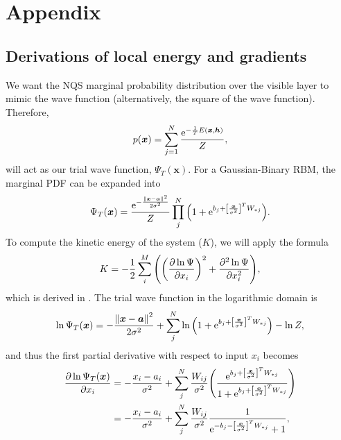 \section{Appendix}\label{sec:Appendix A}

\subsection{Derivations of local energy and gradients}

We want the NQS marginal probability distribution over the visible layer to mimic the wave function (alternatively, the square of the wave function). Therefore, 
\begin{equation*}
    p(\bm{x}) = \sum_{j=1}^N \frac{\mathrm{e}^{-\frac{1}{T}E\qty(\bm{x}, \bm{h})}}{Z}, 
\end{equation*}
will act as our trial wave function, $\Psi_T(\bm{x})$. For a Gaussian-Binary RBM, the marginal PDF can be expanded into
\begin{equation*}
    \Psi_T(\bm{x}) = \frac{\mathrm{e}^{-\frac{\norm{\bm{x}-\bm{a}}^2}{2\sigma^2}}}{Z}\prod_j^N \qty(1 + \mathrm{e}^{b_j + \qty[\frac{\bm{x}}{\sigma^2}]^T W_{*j}}). 
\end{equation*}
To compute the kinetic energy of the system ($K$), we will apply the formula 
\begin{equation*}
    K = -\frac{1}{2}\sum_i^M \qty(\qty(\pdv{\ln{\Psi}}{x_i})^2 + \pdv[2]{\ln{\Psi}}{x_i}), 
\end{equation*}
which is derived in \citep{project1}. The trial wave function in the logarithmic domain is 
\begin{equation*}
    \ln{\Psi_T\qty(\bm{x})} = -\frac{\norm{\bm{x}-\bm{a}}^2}{2\sigma^2} + \sum_j^N \ln{\qty(1+\mathrm{e}^{b_j + \qty[\frac{\bm{x}}{\sigma^2}]^T W_{*j}})} - \ln{Z}, 
\end{equation*}
and thus the first partial derivative with respect to input $x_i$ becomes 
\begin{align}
    \pdv{\ln{\Psi_T\qty(\bm{x})}}{x_i} &= -\frac{x_i-a_i}{\sigma^2} + \sum_j^N\frac{W_{ij}}{\sigma^2}\qty(\frac{\mathrm{e}^{b_j + \qty[\frac{\bm{x}}{\sigma^2}]^T W_{*j}}}{1+\mathrm{e}^{b_j + \qty[\frac{\bm{x}}{\sigma^2}]^T W_{*j}}}) \\
    &= -\frac{x_i-a_i}{\sigma^2} + \sum_j^N\frac{W_{ij}}{\sigma^2}\frac{1}{\mathrm{e}^{-b_j-\qty[\frac{\bm{x}}{\sigma^2}]^TW_{*j}}+1}, 
\end{align}
